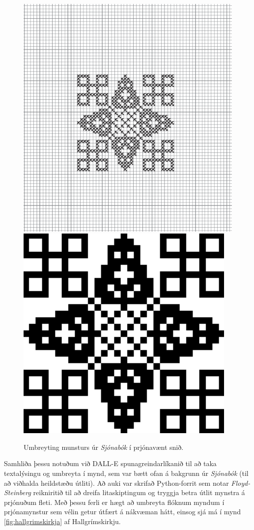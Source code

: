 \documentclass[a4paper,10pt,twocolumn]{article}
\begin{document}
\begin{figure}
    \centering
    \includegraphics[width=.45\linewidth]{figs/sjonabok_before.png}
    \hfill
    \includegraphics[width=.45\linewidth]{figs/sjonabok_after.png}
    \caption{Umbreyting munsturs úr \textit{Sjónabók} í prjónavænt snið.}
    \label{fig:sjonabok_munstur}
\end{figure}

Samhliða þessu notuðum við DALL-E spunagreindarlíkanið til að taka textalýsingu og umbreyta í mynd, sem var bætt ofan á bakgrunn úr \emph{Sjónabók} (til að viðhalda heildstæðu útliti). 
Að auki var skrifað Python-forrit sem notar \textit{Floyd-Steinberg} reikniritið 
\cite{FloydSteinberg} til að dreifa litaskiptingum og tryggja betra útlit 
mynstra á prjónuðum fleti. Með þessu ferli er hægt að umbreyta flóknum 
myndum í prjónamynstur sem vélin getur útfært á nákvæman hátt, einsog sjá má í mynd \ref{fig:hallgrimskirkja} af Hallgrímskirkju.
\end{document}
